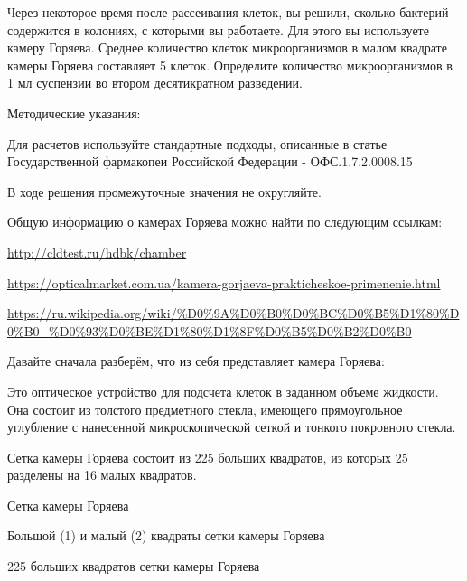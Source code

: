 
Через некоторое время после рассеивания клеток, вы решили, сколько бактерий содержится в колониях, с которыми вы работаете. Для этого вы используете камеру Горяева. Среднее количество клеток микроорганизмов в малом квадрате камеры Горяева составляет 5 клеток. Определите количество микроорганизмов в 1 мл суспензии во втором десятикратном разведении.

Методические указания: 

Для расчетов используйте стандартные подходы, описанные в статье Государственной фармакопеи Российской Федерации - ОФС.1.7.2.0008.15 

В ходе решения промежуточные значения не округляйте. 

Общую информацию о камерах Горяева можно найти по следующим ссылкам:

\noindent\url{http://cldtest.ru/hdbk/chamber}

\noindent\url{https://opticalmarket.com.ua/kamera-gorjaeva-prakticheskoe-primenenie.html}

\noindent\url{https://ru.wikipedia.org/wiki/%D0%9A%D0%B0%D0%BC%D0%B5%D1%80%D0%B0_%D0%93%D0%BE%D1%80%D1%8F%D0%B5%D0%B2%D0%B0}

\solutionSection

Давайте сначала разберём, что из себя представляет камера Горяева:

Это оптическое устройство для подсчета клеток в заданном объеме жидкости. Она состоит из толстого предметного стекла, имеющего прямоугольное углубление с нанесенной микроскопической сеткой и тонкого покровного стекла. 

Сетка камеры Горяева состоит из 225 больших квадратов, из которых 25 разделены на 16 малых квадратов.


\begin{center}
    Сетка камеры Горяева
\end{center}


\begin{center}
    Большой (1) и малый (2) квадраты сетки камеры Горяева
\end{center}


\begin{center}
    225 больших квадратов сетки камеры Горяева
\end{center}

